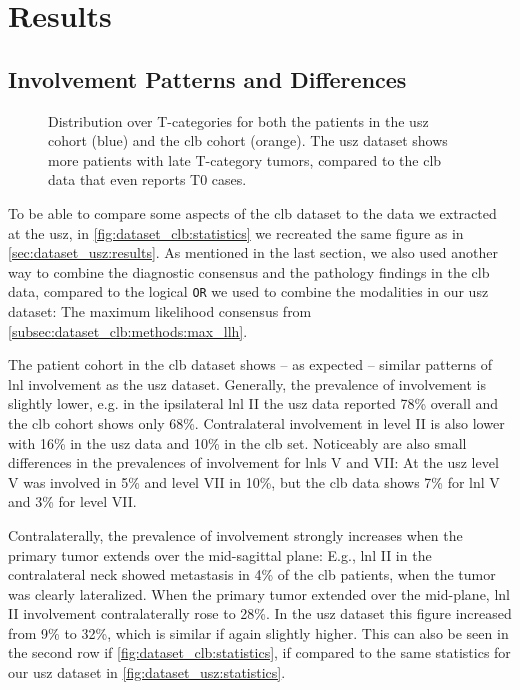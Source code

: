 \documentclass[\relativeRoot/main.tex]{subfiles}
\begin{document}
\section{Results}
\label{sec:dataset_clb:results}

\subsection*{Involvement Patterns and Differences}
\label{subsec:dataset_clb:results:patterns}

\begin{figure}
    \centering
    
    \caption[
        Comparison of T-category distribution in \gls{usz} and \gls{clb} data
    ]{
        Distribution over T-categories for both the patients in the \gls{usz} cohort (blue) and the \gls{clb} cohort (orange). The \gls{usz} dataset shows more patients with late T-category tumors, compared to the \gls{clb} data that even reports T0 cases.
    }
    \label{fig:dataset_clb:tstage_comp}
\end{figure}

To be able to compare some aspects of the \gls{clb} dataset to the data we extracted at the \gls{usz}, in \cref{fig:dataset_clb:statistics} we recreated the same figure as in \cref{sec:dataset_usz:results}. As mentioned in the last section, we also used another way to combine the diagnostic consensus and the pathology findings in the \gls{clb} data, compared to the logical \texttt{OR} we used to combine the modalities in our \gls{usz} dataset: The maximum likelihood consensus from \cref{subsec:dataset_clb:methods:max_llh}.

The patient cohort in the \gls{clb} dataset shows -- as expected -- similar patterns of \gls{lnl} involvement as the \gls{usz} dataset. Generally, the prevalence of involvement is slightly lower, e.g. in the ipsilateral \gls{lnl} II the \gls{usz} data reported 78\% overall and the \gls{clb} cohort shows only 68\%. Contralateral involvement in level II is also lower with 16\% in the \gls{usz} data and 10\% in the \gls{clb} set. Noticeably are also small differences in the prevalences of involvement for \glspl{lnl} V and VII: At the \gls{usz} level V was involved in 5\% and level VII in 10\%, but the \gls{clb} data shows 7\% for \gls{lnl} V and 3\% for level VII.

Contralaterally, the prevalence of involvement strongly increases when the primary tumor extends over the mid-sagittal plane: E.g., \gls{lnl} II in the contralateral neck showed metastasis in 4\% of the \gls{clb} patients, when the tumor was clearly lateralized. When the primary tumor extended over the mid-plane, \gls{lnl} II involvement contralaterally rose to 28\%. In the \gls{usz} dataset this figure increased from 9\% to 32\%, which is similar if again slightly higher. This can also be seen in the second row if \cref{fig:dataset_clb:statistics}, if compared to the same statistics for our \gls{usz} dataset in \cref{fig:dataset_usz:statistics}.
\end{document}
